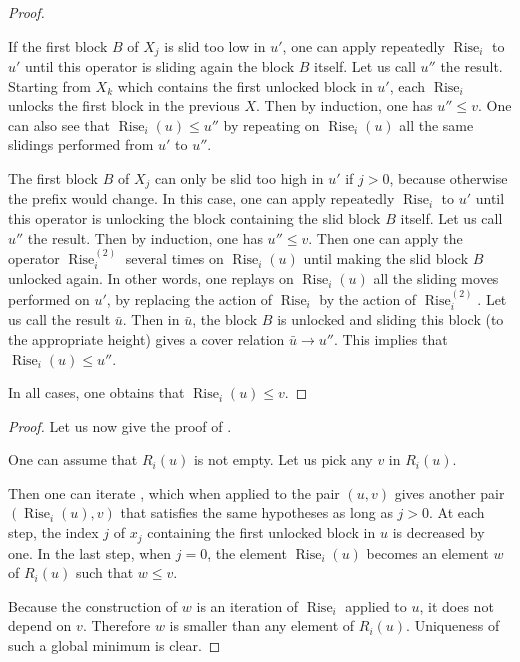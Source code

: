 \documentclass[10pt]{article}
\theoremstyle{definition}
\DeclareMathOperator{\rise}{Rise}
\begin{document}
\begin{proof}
\begin{enumerate}
  If the first block $B$ of $X_j$ is slid too low in $u'$, one can
  apply repeatedly $\rise_i$ to $u'$ until this operator is sliding
  again the block $B$ itself. Let us call $u''$ the result. Starting
  from $X_k$ which contains the first unlocked block in $u'$, each
  $\rise_i$ unlocks the first block in the previous $X$. Then by
  induction, one has $u'' \leq v$. One can also see that
  $\rise_i(u) \leq u''$ by repeating on $\rise_i(u)$ all the same
  slidings performed from $u'$ to $u''$.

  The first block $B$ of $X_j$ can only be slid too high in $u'$ if
  $j > 0$, because otherwise the prefix would change. In this case,
  one can apply repeatedly $\rise_i$ to $u'$ until this operator is
  unlocking the block containing the slid block $B$ itself. Let us
  call $u''$ the result. Then by induction, one has $u'' \leq v$. Then
  one can apply the operator $\rise^{(2)}_i$ several times on
  $\rise_i(u)$ until making the slid block $B$ unlocked again. In
  other words, one replays on $\rise_i(u)$ all the sliding moves
  performed on $u'$, by replacing the action of $\rise_i$ by the
  action of $\rise^{(2)}_i$. Let us call the result $\bar{u}$. Then in $\bar{u}$,
  the block $B$ is unlocked and sliding this block (to the appropriate
  height) gives a cover relation $\bar{u} \to u''$. This implies that
  $\rise_i(u) \leq u''$.
\end{enumerate}

  In all cases, one obtains that $\rise_i(u) \leq v$.
\end{proof}

\begin{proof}
Let us now give the proof of . 

One can assume that $R_i(u)$ is not empty. Let us pick any $v$ in $R_i(u)$.

Then one can iterate , which when applied to the
pair $(u,v)$ gives another pair $(\rise_i(u),v)$ that satisfies the
same hypotheses as long as $j > 0$. At each step, the index $j$ of
$x_j$ containing the first unlocked block in $u$ is decreased by
one. In the last step, when $j=0$, the element $\rise_i(u)$ becomes an
element $w$ of $R_i(u)$ such that $w \leq v$.

Because the construction of $w$ is an iteration of $\rise_i$ applied
to $u$, it does not depend on $v$. Therefore $w$ is smaller than any
element of $R_i(u)$. Uniqueness of such a global minimum is clear.
\end{proof}
\end{document}
